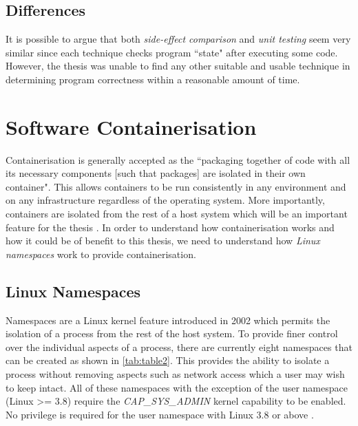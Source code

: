 \documentclass[hidelinks]{report}
\begin{document}
\subsection{Differences}
It is possible to argue that both \textit{side-effect comparison} and \textit{unit testing} seem very similar since each technique checks program ``state" after executing some code. However, the thesis was unable to find any other suitable and usable technique in determining program correctness within a reasonable amount of time.

\clearpage
\section{Software Containerisation}
Containerisation is generally accepted as the ``packaging together of code with all its necessary components [such that packages] are isolated in their own container". This allows containers to be run consistently in any environment and on any infrastructure regardless of the operating system. More importantly, containers are isolated from the rest of a host system which will be an important feature for the thesis \cite{containerisationGeneral}.
In order to understand how containerisation works and how it could be of benefit to this thesis, we need to understand how \textit{Linux namespaces} work to provide containerisation.

\subsection{Linux Namespaces}
Namespaces are a Linux kernel feature introduced in 2002 which permits the isolation of a process from the rest of the host system. To provide finer control over the individual aspects of a process, there are currently eight namespaces that can be created as shown in \autoref{tab:table2}. This provides the ability to isolate a process without removing aspects such as network access which a user may wish to keep intact. All of these namespaces with the exception of the user namespace (Linux >= 3.8) require the \textit{CAP\_SYS\_ADMIN} kernel capability to be enabled. No privilege is required for the user namespace with Linux 3.8 or above \cite{containerisationManPage}.
\end{document}
